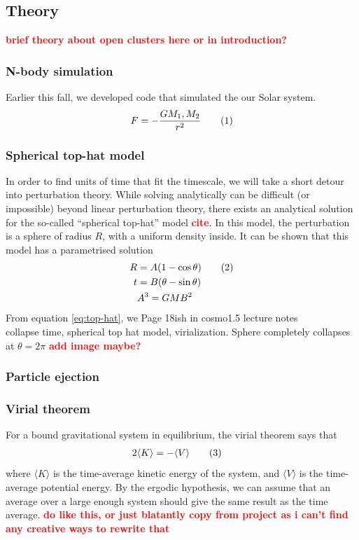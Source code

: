 \documentclass{article}
\newcommand\red[1]{\textcolor{red}{\textbf{#1}}}
\newcommand\numberthis{\addtocounter{equation}{1}\tag{\theequation}}
\begin{document}
\subsection{Theory}
\red{brief theory about open clusters here or in introduction?}
\subsubsection{N-body simulation}
Earlier this fall, we developed code that simulated the our Solar system.
\begin{align*}
  F = -\frac{G M_1, M_2}{r^2}\numberthis\label{eq:newton}
\end{align*}

\subsubsection{Spherical top-hat model}
In order to find units of time that fit the timescale, we will take a short detour into perturbation theory. While solving analytically can be difficult (or impossible) beyond linear perturbation theory, there exists an analytical solution for the so-called ``spherical top-hat'' model \red{cite}. In this model, the perturbation is a sphere of radius $R$, with a uniform density inside. It can be shown that this model has a parametrised solution
\begin{align*}
  R &= A(1-\cos\theta)\numberthis\label{eq:top-hat}\\
  t &= B(\theta-\sin\theta)\\
  &A^3 = GMB^2 
\end{align*}
From equation \eqref{eq:top-hat}, we 
Page 18ish in cosmo1.5 lecture notes\\
collapse time, spherical top hat model, virialization.
Sphere completely collapses at $\theta = 2\pi$ \red{add image maybe?}

\subsubsection{Particle ejection}

\subsubsection{Virial theorem}
For a bound gravitational system in equilibrium, the virial theorem says that
\begin{align*}
  2\langle K\rangle &= -\langle V\rangle \numberthis\label{eq:virial}
\end{align*}
where $\langle K\rangle$ is the time-average kinetic energy of the system, and $\langle V\rangle$ is the time-average potential energy. By the ergodic hypothesis, we can assume that an average over a large enough system should give the same result as the time average. \red{do like this, or just blatantly copy from project as i can't find any creative ways to rewrite that} 
\end{document}
